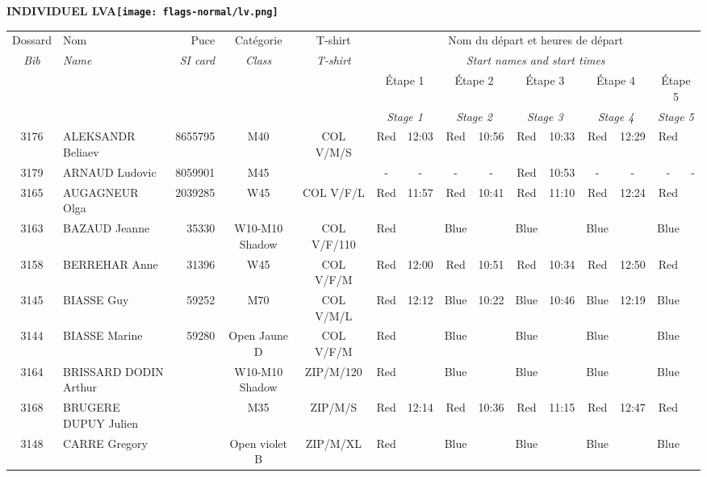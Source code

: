 \documentclass{report}
\begin{document}
\newpage
  \Huge \centering \bfseries INDIVIDUEL  LVA\normalfont \footnotesize \sffamily \hfill \texttt{[image: flags-normal/lv.png]} \newline 
  \begin{longtable}{|c|l|r|c|c|*{5}{cc|}}
    Dossard & Nom  & Puce    & Catégorie & T-shirt & \multicolumn{10}{c|}{Nom du départ et heures de départ} \\
    \itshape Bib     & \itshape Name & \itshape SI card & \itshape Class  & \itshape  T-shirt  & \multicolumn{10}{c|}{\itshape Start names and start times} \\
    \hline
    & & & & & \multicolumn{2}{c|}{Étape 1} & \multicolumn{2}{c|}{Étape 2} & \multicolumn{2}{c|}{Étape 3} & \multicolumn{2}{c|}{Étape 4} & \multicolumn{2}{c|}{Étape 5} \\
    & & & & & \multicolumn{2}{c|}{\itshape Stage 1} & \multicolumn{2}{c|}{\itshape Stage 2} & \multicolumn{2}{c|}{\itshape Stage 3} & \multicolumn{2}{c|}{\itshape Stage 4} & \multicolumn{2}{c|}{\itshape Stage 5} \\
    \hline
    3176 & ALEKSANDR Beliaev & 8655795 & M40 & COL V/M/S & Red & 12:03 & Red & 10:56 & Red & 10:33 & Red & 12:29 & Red &  \\
    3179 & ARNAUD Ludovic & 8059901 & M45 &   & - &  - & - &  - & Red & 10:53 & - &  - & - &  -\\
    3165 & AUGAGNEUR Olga & 2039285 & W45 & COL V/F/L & Red & 11:57 & Red & 10:41 & Red & 11:10 & Red & 12:24 & Red &  \\
    3163 & BAZAUD Jeanne & 35330 & W10-M10 Shadow & COL V/F/110 & Red &   & Blue &   & Blue &   & Blue &   & Blue &  \\
    3158 & BERREHAR Anne & 31396 & W45 & COL V/F/M & Red & 12:00 & Red & 10:51 & Red & 10:34 & Red & 12:50 & Red &  \\
    3145 & BIASSE Guy & 59252 & M70 & COL V/M/L & Red & 12:12 & Blue & 10:22 & Blue & 10:46 & Blue & 12:19 & Blue &  \\
    3144 & BIASSE Marine & 59280 & Open Jaune D & COL V/F/M & Red &   & Blue &   & Blue &   & Blue &   & Blue &  \\
    3164 & BRISSARD DODIN Arthur &  & W10-M10 Shadow & ZIP/M/120 & Red &   & Blue &   & Blue &   & Blue &   & Blue &  \\
    3168 & BRUGERE DUPUY Julien &  & M35 & ZIP/M/S & Red & 12:14 & Red & 10:36 & Red & 11:15 & Red & 12:47 & Red &  \\
    3148 & CARRE Gregory &  & Open violet B & ZIP/M/XL & Red &   & Blue &   & Blue &   & Blue &   & Blue &  \\

\end{longtable}
\end{document}
